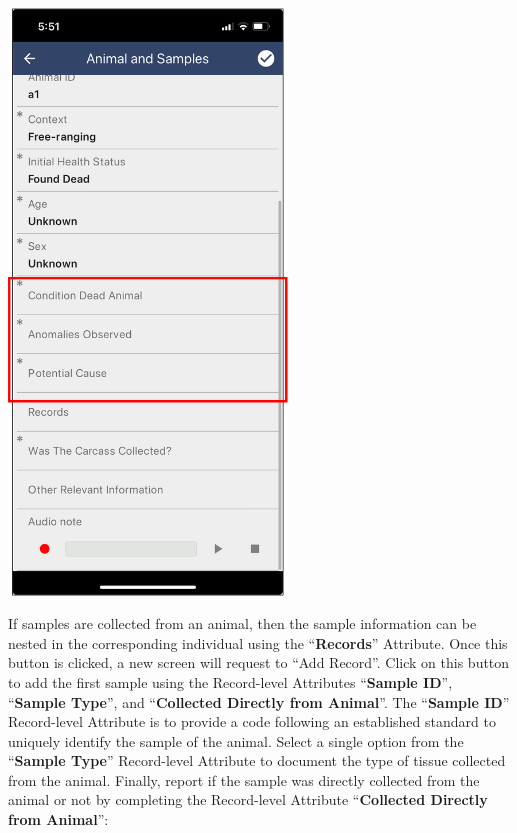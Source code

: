 \documentclass[
  letterpaper,
  DIV=11,
  numbers=noendperiod]{scrreprt}
\begin{document}
\includegraphics[width=2.91667in,height=\textheight]{Pictures_for_manual/Picture16.png}

If samples are collected from an animal, then the sample information can
be nested in the corresponding individual using the ``\textbf{Records}''
Attribute. Once this button is clicked, a new screen will request to
``Add Record''. Click on this button to add the first sample using the
Record-level Attributes ``\textbf{Sample ID}'', ``\textbf{Sample
Type}'', and ``\textbf{Collected Directly from Animal}''. The
``\textbf{Sample ID}'' Record-level Attribute is to provide a code
following an established standard to uniquely identify the sample of the
animal. Select a single option from the ``\textbf{Sample Type}''
Record-level Attribute to document the type of tissue collected from the
animal. Finally, report if the sample was directly collected from the
animal or not by completing the Record-level Attribute
``\textbf{Collected Directly from Animal}'':
\end{document}

